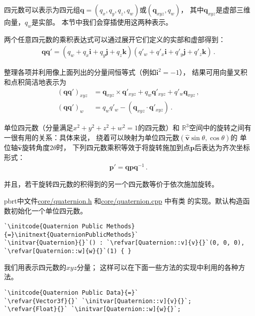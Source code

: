 四元数可以表示为四元组$\bm q=(q_x,q_y,q_z,q_w)$或$(\bm q_{xyz},q_w)$，
其中$\bm q_{xyz}$是虚部三维向量，$q_w$是实部。
本节中我们会穿插使用这两种表示。

两个任意四元数的乘积表达式可以通过展开它们定义的实部和虚部得到：
\begin{align*}
    \bm q\bm q'=(q_w+q_x\mathbf{i}+q_y\mathbf{j}+q_z\mathbf{k})(q'_w+q'_x\mathbf{i}+q'_y\mathbf{j}+q'_z\mathbf{k})\, .
\end{align*}

整理各项并利用像上面列出的分量间恒等式（例如$\mathbf{i}^2=-1$），
结果可用向量叉积和点积简洁地表示为
\begin{align}\label{eq:2.5}
    (\bm q\bm q')_{xyz} & =\bm q_{xyz}\times\bm q'_{xyz}+q_w\bm q'_{xyz}+q'_w\bm q_{xyz}\nonumber\, , \\
    (\bm q\bm q')_w     & =q_wq'_w-(\bm q_{xyz}\cdot\bm q'_{xyz})\, .
\end{align}

单位四元数（分量满足$x^2+y^2+z^2+w^2=1$的四元数）和
$\mathbb{R}^3$空间中的旋转之间有一很有用的关系：具体来说，
绕着可以映射为单位四元数$(\hat{\bm v}\sin\theta,\cos\theta)$的
单位轴$\hat{\bm v}$旋转角度$2\theta$时，
下列四元数乘积等效于将旋转施加到点$\bm p$后表达为齐次坐标形式：
\begin{align*}
    \bm p'=\bm q\bm p\bm q^{-1}\, .
\end{align*}

并且，若干旋转四元数的积得到的另一个四元数等价于依次施加旋转。

pbrt中文件\href{https://github.com/mmp/pbrt-v3/tree/master/src/core/quaternion.h}{{\ttfamily core/quaternion.h}}
和\href{https://github.com/mmp/pbrt-v3/tree/master/src/core/quaternion.cpp}{{\ttfamily core/quaternion.cpp}}
中有类
的实现。默认构造函数初始化一个单位四元数。
\begin{lstlisting}
`\initcode{Quaternion Public Methods}{=}\initnext{QuaternionPublicMethods}`
`\initvar{Quaternion}{}`() : `\refvar[Quaternion::v]{v}{}`(0, 0, 0), `\refvar[Quaternion::w]{w}{}`(1) { }
\end{lstlisting}

我们用表示四元数的$xyz$分量；
这样可以在下面一些方法的实现中利用的各种方法。
\begin{lstlisting}
`\initcode{Quaternion Public Data}{=}`
`\refvar{Vector3f}{}` `\initvar[Quaternion::v]{v}{}`;
`\refvar{Float}{}` `\initvar[Quaternion::w]{w}{}`;
\end{lstlisting}

